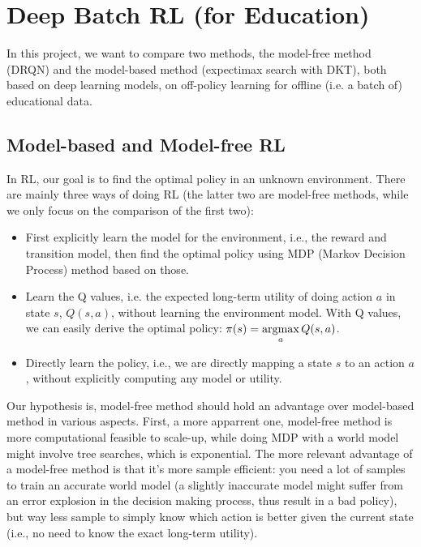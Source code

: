 \section{Deep Batch RL (for Education)}
\label{deepRL}

In this project, we want to compare two methods, the model-free method (DRQN) and the model-based method (expectimax search with DKT), both based on deep learning models, on off-policy learning for offline (i.e. a batch of) educational data.

\subsection{Model-based and Model-free RL}

In RL, our goal is to find the optimal policy in an unknown environment. There are mainly three ways of doing RL (the latter two are model-free methods, while we only focus on the comparison of the first two):

\begin{itemize}
\item First explicitly learn the model for the environment, i.e., the reward and transition model, then find the optimal policy using MDP (Markov Decision Process) method based on those.
\item Learn the Q values, i.e. the expected long-term utility of doing action $a$ in state $s$, $Q(s, a)$, without learning the environment model. With Q values, we can easily derive the optimal policy: $\pi(s)=\argmax\limits_a Q(s, a)$.
\item Directly learn the policy, i.e., we are directly mapping a state $s$ to an action $a$, without explicitly computing any model or utility. 
\end{itemize}

Our hypothesis is, model-free method should hold an advantage over model-based method in various aspects. First, a more apparrent one, model-free method is more computational feasible to scale-up, while doing MDP with a world model might involve tree searches, which is exponential. The more relevant advantage of a model-free method is that it's more sample efficient: you need a lot of samples to train an accurate world model (a slightly inaccurate model might suffer from an error explosion in the decision making process, thus result in a bad policy), but way less sample to simply know which action is better given the current state (i.e., no need to know the exact long-term utility).

